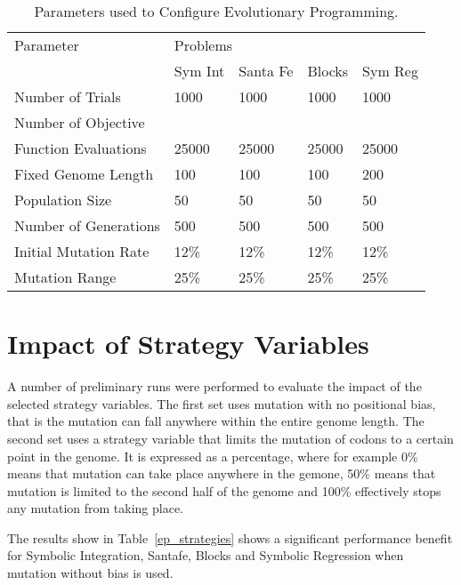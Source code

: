 \begin{table}[h]
\begin{center}
\begin{tabular}{|l|l|l|l|l|}
\hline
Parameter &\multicolumn{4}{l|}{Problems}\\
\cline{2-1} \cline{3-1} \cline{4-1} \cline{5-1} 
 & Sym Int & Santa Fe & Blocks & Sym Reg \\
\hline
Number of Trials & 1000 & 1000 & 1000 & 1000  \\
Number of Objective & & & & \\ 
Function Evaluations  & 25000 & 25000 & 25000 & 25000  \\
Fixed Genome Length  & 100 & 100 & 100 & 200 \\
Population Size  & 50 & 50 & 50 & 50  \\
Number of Generations  & 500 & 500 & 500 & 500 \\
Initial Mutation Rate & 12\% & 12\% & 12\% & 12\% \\
Mutation Range & 25\% & 25\% & 25\% & 25\%  \\ 
\hline
\end{tabular}
\caption{\label{ep_param_table} Parameters used to Configure Evolutionary Programming.}
\end{center}
\end{table}


\section{Impact of Strategy Variables}

A number of preliminary runs were performed to evaluate the impact of the selected strategy variables. The first set uses mutation with no positional bias, that is the mutation can fall anywhere within the entire genome length. The second set uses a strategy variable that limits the mutation of codons to a certain point in the genome. It is expressed as a percentage, where for example 0\% means that mutation can take place anywhere in the gemone, 50\% means that mutation is limited to the second half of the genome and 100\% effectively stops any mutation from taking place. 

The results show in Table~\ref{ep_strategies} shows a significant performance benefit for Symbolic Integration, Santafe, Blocks and Symbolic Regression when mutation without bias is used.

